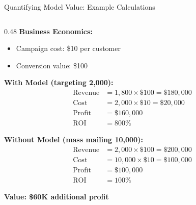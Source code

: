 \begin{frame}{Quantifying Model Value: Example Calculations}
\begin{columns}
\begin{column}{0.48\textwidth}
\textbf{Business Economics:}
\begin{itemize}
\item Campaign cost: \$10 per customer
\item Conversion value: \$100
\end{itemize}

\textbf{With Model (targeting 2,000):}
\begin{align*}
\text{Revenue} &= 1,800 \times \$100 = \$180,000 \\
\text{Cost} &= 2,000 \times \$10 = \$20,000 \\
\text{Profit} &= \$160,000 \\
\text{ROI} &= 800\%
\end{align*}

\textbf{Without Model (mass mailing 10,000):}
\begin{align*}
\text{Revenue} &= 2,000 \times \$100 = \$200,000 \\
\text{Cost} &= 10,000 \times \$10 = \$100,000 \\
\text{Profit} &= \$100,000 \\
\text{ROI} &= 100\%
\end{align*}

\textcolor{forest}{\textbf{Value: \$60K additional profit}}
\end{column}
\end{columns}
\end{frame}


